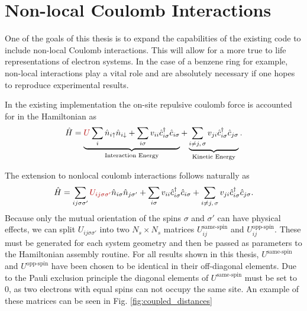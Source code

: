 \section{Non-local Coulomb Interactions} \label{sec:non_local_coulomb}

One of the goals of this thesis is to expand the capabilities of the existing code to include non-local Coulomb interactions. This will allow for a more true to life representations of electron systems. In the case of a benzene ring for example, non-local interactions play a vital role and are absolutely necessary if one hopes to reproduce experimental results. 

\bigskip

In the existing implementation the on-site repulsive coulomb force is accounted for in the Hamiltonian as
\begin{equation}
    \hat{H}=\underbrace{{\color{red!70!black} U} \sum_{i} \hat{n}_{i \uparrow} \hat{n}_{i \downarrow} + \sum_{i\sigma} v_{ii} \hat{c}_{i \sigma}^{\dagger} \hat{c}_{i \sigma}}_{\text{Interaction Energy}}+%
    \underbrace{\sum_{{i\neq j,\, \sigma}} v_{j i} \hat{c}_{i \sigma}^{\dagger} \hat{c}_{j \sigma}}_{\text{Kinetic Energy}}\label{eq:local_ham_nonsym}.
\end{equation}

 The extension to nonlocal coulomb interactions follows naturally as
 \begin{equation}
    \hat{H}= \sum_{ij\sigma\sigma'}{\color{red!70!black} U_{ij\sigma\sigma'}}\hat{n}_{i \sigma} \hat{n}_{j\sigma'}+\sum_{i\sigma} v_{ii} \hat{c}_{i \sigma}^{\dagger} \hat{c}_{i \sigma} + %
    \sum_{i\neq j,\,\sigma} v_{j i} \hat{c}_{i \sigma}^{\dagger} \hat{c}_{j \sigma}%
    \label{eq:ham_nonsym}.
\end{equation}
Because only the mutual orientation of the spins $\sigma$ and $\sigma'$ can have physical effects, we can split $U_{ij\sigma\sigma'}$ into two $N_s\times N_s$ matrices $U_{ij}^{\text{same-spin}}$ and $U_{ij}^{\text{opp-spin}}$. These must be generated for each system geometry and then be passed as parameters to the Hamiltonian assembly routine. For all results shown in this thesis, $U^{\text{same-spin}}$ and $U^{\text{opp-spin}}$ have been chosen to be identical in their off-diagonal elements. Due to the Pauli exclusion principle the diagonal elements of $U^{\text{same-spin}}$ must be set to $0$, as two electrons with equal spins can not occupy the same site. An example of these matrices can be seen in Fig. \ref{fig:coupled_distances}


